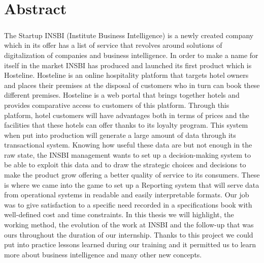 \chapter{Abstract}

\paragraph{}
The Startup INSBI (Institute Business Intelligence) is a newly created company which in its offer has a list of service that revolves around solutions of digitalization of companies and business intelligence. In order to make a name for itself in the market INSBI has produced and launched its first product which is Hosteline. Hosteline is an online hospitality platform that targets hotel owners and places their premises at the disposal of customers who in turn can book these different premises. Hosteline is a web portal that brings together hotels and provides comparative access to customers of this platform. Through this platform, hotel customers will have advantages both in terms of prices and the facilities that these hotels can offer thanks to its loyalty program. This system when put into production will generate a large amount of data through its transactional system. Knowing how useful these data are but not enough in the raw state, the INSBI management wants to set up a decision-making system to be able to exploit this data and to draw the strategic choices and decisions to make the product grow offering a better quality of service to its consumers. These is where we came into the game to set up a Reporting system that will serve data from operational systems in readable and easily interpretable formats. Our job was to give satisfaction to a specific need recorded in a specifications book with well-defined cost and time constraints. In this thesis we will highlight, the working method, the evolution of the work at INSBI and the follow-up that was ours throughout the duration of our internship. Thanks to this project we could put into practice lessons learned during our training and it permitted us to learn more about business intelligence and many other new concepts.